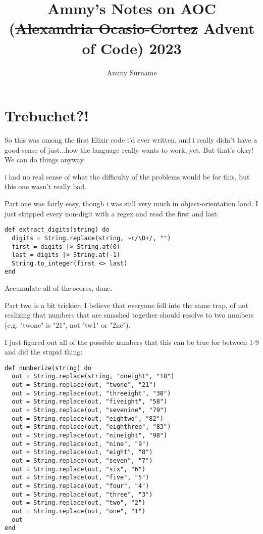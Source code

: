 \documentclass{article}
\title{Ammy's Notes on AOC (\sout{Alexandria Ocasio-Cortez} Advent of Code) 2023}
\author{Ammy Surname}
\begin{document}
\maketitle

\section{Trebuchet?!}
So this was among the first Elixir code i'd ever written, and i really didn't have a good sense of just...how the language really wants to work, yet. But that's okay! We can do things anyway.

i had no real sense of what the difficulty of the problems would be for this, but this one wasn't really bad.

Part one was fairly easy, though i was still very much in object-orientation land. I just stripped every non-digit with a regex and read the first and last:

\begin{verbatim}
def extract_digits(string) do
  digits = String.replace(string, ~r/\D+/, "")
  first = digits |> String.at(0)
  last = digits |> String.at(-1)
  String.to_integer(first <> last)
end
\end{verbatim}

Accumulate all of the scores, done.

Part two is a bit trickier; I believe that everyone fell into the same trap, of not realizing that numbers that are smashed together should resolve to two numbers (e.g. "twone" is "21", not "tw1" or "2ne").

I just figured out all of the possible numbers that this can be true for between 1-9 and did the stupid thing:

\begin{verbatim}
def numberize(string) do
  out = String.replace(string, "oneight", "18")
  out = String.replace(out, "twone", "21")
  out = String.replace(out, "threeight", "38")
  out = String.replace(out, "fiveight", "58")
  out = String.replace(out, "sevenine", "79")
  out = String.replace(out, "eightwo", "82")
  out = String.replace(out, "eighthree", "83")
  out = String.replace(out, "nineight", "98")
  out = String.replace(out, "nine", "9")
  out = String.replace(out, "eight", "8")
  out = String.replace(out, "seven", "7")
  out = String.replace(out, "six", "6")
  out = String.replace(out, "five", "5")
  out = String.replace(out, "four", "4")
  out = String.replace(out, "three", "3")
  out = String.replace(out, "two", "2")
  out = String.replace(out, "one", "1")
  out
end
\end{verbatim}
\end{document}
